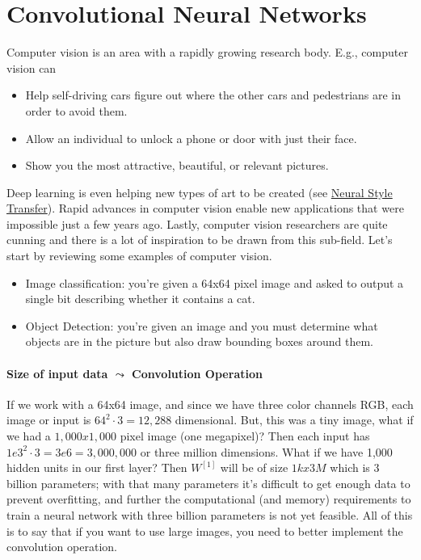 \documentclass[12pt]{article}
\begin{document}
\section{Convolutional Neural Networks} Computer vision is an area with a rapidly growing research body. E.g.,
computer vision can
\begin{itemize} 
\item Help self-driving cars figure out where the other cars and pedestrians are in order to avoid them.
\item Allow an individual to unlock a phone or door with just their face.
\item Show you the most attractive, beautiful, or relevant pictures. \end{itemize}

Deep learning is even helping new types of art to be created (see \href{https://en.wikipedia.org/wiki/Neural_Style_Transfer}{Neural Style Transfer}). Rapid advances in computer vision enable new applications
that were impossible just a few years ago. Lastly, computer vision researchers are quite cunning and there is a lot of
inspiration to be drawn from this sub-field. Let's start by reviewing some examples of computer vision.
\begin{itemize}   \item Image classification: you're given a 64x64 pixel image and asked to output a single bit describing 
    whether it contains a cat.
  \item Object Detection: you're given an image and you must determine what objects are in the picture but also draw bounding boxes around them. \end{itemize}

\paragraph{Size of input data $\leadsto$ Convolution Operation} 
If we work with a 64x64 image, and since we have three color channels RGB, each image or input is
$64^2 \cdot 3 = 12,288$ dimensional. But, this was a tiny image, what if we had a $1,000 x 1,000$ pixel image (one megapixel)? Then
each input has $1e3^2 \cdot 3 = 3e6 = 3,000,000$ or three million dimensions. What if we have 1,000 hidden units in our first layer?
Then $W^{[1]}$ will be of size $1k x 3M$ which is 3 billion parameters; with that many parameters it's difficult to get enough
data to prevent overfitting, and further the computational (and memory) requirements to train a neural network with three billion
parameters is not yet feasible. All of this is to say that if you want to use large images, you need to better implement the
convolution operation.
\end{document}
